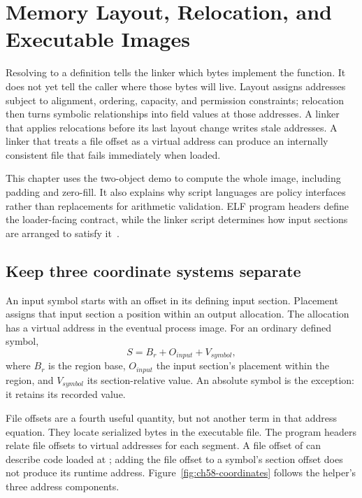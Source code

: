 \chapter{Memory Layout, Relocation, and Executable Images}
\label{ch:link-layout}

Resolving  to a definition tells the linker which bytes implement the function.
It does not yet tell the caller where those bytes will live.
Layout assigns addresses subject to alignment, ordering, capacity, and permission constraints; relocation then turns symbolic relationships into field values at those addresses.
A linker that applies relocations before its last layout change writes stale addresses.
A linker that treats a file offset as a virtual address can produce an internally consistent file that fails immediately when loaded.

This chapter uses the two-object demo to compute the whole image, including padding and zero-fill.
It also explains why script languages are policy interfaces rather than replacements for arithmetic validation.
ELF program headers define the loader-facing contract, while the linker script determines how input sections are arranged to satisfy it~\cite{xinuos-2026-elf,gnu-2026-ld}.

\section{Keep three coordinate systems separate}
\label{sec:ch58-coordinates}

An input symbol starts with an offset in its defining input section.
Placement assigns that input section a position within an output allocation.
The allocation has a virtual address in the eventual process image.
For an ordinary defined symbol,
\[
 S=B_r+O_{input}+V_{symbol},
\]
where $B_r$ is the region base, $O_{input}$ the input section's placement within the region, and $V_{symbol}$ its section-relative value.
An absolute symbol is the exception: it retains its recorded value.

File offsets are a fourth useful quantity, but not another term in that address equation.
They locate serialized bytes in the executable file.
The program headers relate file offsets to virtual addresses for each segment.
A file offset of  can describe code loaded at ; adding the file offset to a symbol's section offset does not produce its runtime address.
Figure~\ref{fig:ch58-coordinates} follows the helper's three address components.

